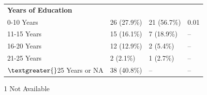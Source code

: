 \documentclass[12pt]{article}
\begin{document}
\begin{table}[htbp]
\begin{threeparttable}
\begin{tabularx}{\textwidth}{>{\raggedright\arraybackslash}Xlll}
            \midrule
            \textbf{Years of Education} &  &  &  \\
            \hspace{1em} 0-10 Years & 26 (27.9\%) & 21 (56.7\%) & 0.01 \\
            \hspace{1em} 11-15 Years & 15 (16.1\%) & 7 (18.9\%) & -- \\
            \hspace{1em} 16-20 Years & 12 (12.9\%) & 2 (5.4\%) & -- \\
            \hspace{1em} 21-25 Years & 2 (2.1\%) & 1 (2.7\%) & -- \\
            \hspace{1em} $\textgreater{}$25 Years or NA\tnote{1} & 38 (40.8\%) & -- & -- \\
            \bottomrule
        \end{tabularx}
        \begin{tablenotes}
            \footnotesize
            \item[1] Not Available
        \end{tablenotes}
    \end{threeparttable}
\end{table}
\end{document}
